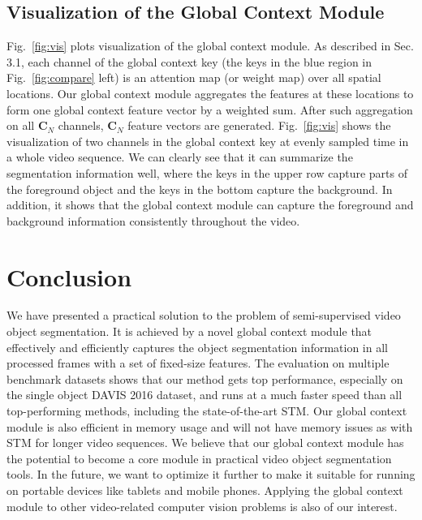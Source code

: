 \documentclass[runningheads]{llncs}
\begin{document}
\subsection{Visualization of the Global Context Module}

Fig.~\ref{fig:vis} plots visualization of the global context module. As described in Sec. 3.1, each channel of the global context key (the keys in the blue region in Fig.~\ref{fig:compare} left) is an attention map (or weight map) over all spatial locations. Our global context module aggregates the features at these locations to form one global context feature vector by a weighted sum. After such aggregation on all $\bm{C}_N$ channels, $\bm{C}_N$ feature vectors are generated. Fig.~\ref{fig:vis} shows the visualization of two channels in the global context key at evenly sampled time in a whole video sequence. We can clearly see that it can summarize the segmentation information well, where the keys in the upper row capture parts of the foreground object and the keys in the bottom capture the background. In addition, it shows that the global context module can capture the foreground and background information consistently throughout the video. 

\section{Conclusion}
\label{sec:conclusion}

We have presented a practical solution to the problem of semi-supervised video object segmentation. It is achieved by a novel global context module that effectively and efficiently captures the object segmentation information in all processed frames with a set of fixed-size features. The evaluation on multiple benchmark datasets shows that our method gets top performance, especially on the single object DAVIS 2016 dataset, and runs at a much faster speed than all top-performing methods, including the state-of-the-art STM. Our global context module is also efficient in memory usage and will not have memory issues as with STM for longer video sequences. We believe that our global context module has the potential to become a core module in practical video object segmentation tools. In the future, we want to optimize it further to make it suitable for running on portable devices like tablets and mobile phones. Applying the global context module to other video-related computer vision problems is also of our interest.

\clearpage
\end{document}
